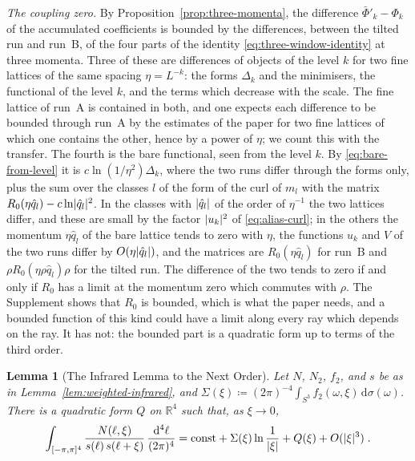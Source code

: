 \documentclass[11pt]{preprint}
\newcommand{\dd}{\mathrm{d}}
\DeclarePairedDelimiter{\abs}{\lvert}{\rvert}
\numberwithin{equation}{section}
\newtheorem{lemma}[theorem]{Lemma}
\theoremstyle{definition}
\theoremstyle{remark}
\theoremstyle{plain}
\begin{document}
\emph{The coupling zero.} By Proposition~\ref{prop:three-momenta}, the difference $\bar\Phi'_k - \Phi_k$ of the accumulated coefficients is bounded by the differences, between the tilted run and run~B, of the four parts of the identity \eqref{eq:three-window-identity} at three momenta. Three of these are differences of objects of the level $k$ for two fine lattices of the same spacing $\eta = L^{-k}$: the forms $\Delta_k$ and the minimisers, the functional of the level $k$, and the terms which decrease with the scale. The fine lattice of run~A is contained in both, and one expects each difference to be bounded through run~A by the estimates of the paper for two fine lattices of which one contains the other, hence by a power of $\eta$; we count this with the transfer. The fourth is the bare functional, seen from the level $k$. By \eqref{eq:bare-from-level} it is $c\ln(1/\eta^2)\Delta_k$, where the two runs differ through the forms only, plus the sum over the classes $l$ of the form of the curl of $m_l$ with the matrix $R_0(\eta\hat q_l) - c\ln\abs{\hat q_l}^2$. In the classes with $\abs{\hat q_l}$ of the order of $\eta^{-1}$ the two lattices differ, and these are small by the factor $\abs{u_k}^2$ of \eqref{eq:alias-curl}; in the others the momentum $\eta\hat q_l$ of the bare lattice tends to zero with $\eta$, the functions $u_k$ and $V$ of the two runs differ by $O(\eta\abs{\hat q_l})$, and the matrices are $R_0(\eta\hat q_l)$ for run~B and $\rho R_0(\eta\rho\hat q_l)\rho$ for the tilted run. The difference of the two tends to zero if and only if $R_0$ has a limit at the momentum zero which commutes with $\rho$. The Supplement shows that $R_0$ is bounded, which is what the paper needs, and a bounded function of this kind could have a limit along every ray which depends on the ray. It has not: the bounded part is a quadratic form up to terms of the third order.

\begin{lemma}[The Infrared Lemma to the Next Order]\label{lem:infrared-next}
Let $N$, $N_2$, $f_2$, and $s$ be as in Lemma~\ref{lem:weighted-infrared}, and $\Sigma(\xi) \coloneqq (2\pi)^{-4}\int_{S^3}f_2(\omega, \xi)\,\dd\sigma(\omega)$. There is a quadratic form $Q$ on $\mathbb R^4$ such that, as $\xi \to 0$,
\begin{equation}\label{eq:infrared-next}
    \int_{[-\pi,\pi]^4}\frac{N(\ell, \xi)}{s(\ell)\,s(\ell + \xi)}\,\frac{\dd^4\ell}{(2\pi)^4} = \mathrm{const} + \Sigma(\xi)\ln\frac{1}{\abs\xi} + Q(\xi) + O(\abs\xi^3)\;.
\end{equation}
\end{lemma}
\end{document}
